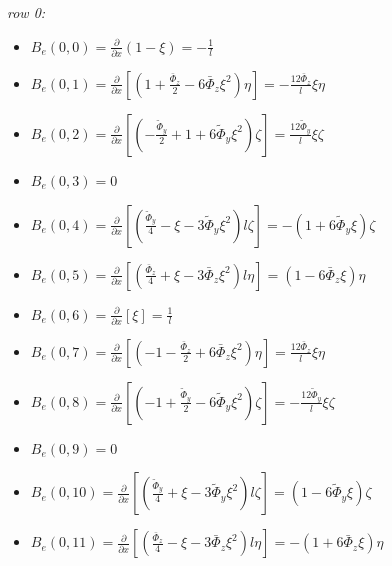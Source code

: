 \documentclass[a4paper,11pt]{article}
\newcommand{\gr}{\textbf}
\begin{document}
\noindent \textit{row 0:}
\begin{itemize}[label=$\gr{-}$, font=\LARGE, font=\color{color1}, topsep = 0.2cm, itemsep=0.2cm]
	\item $B_e(0,0) = \frac{\partial}{\partial x} (1- \xi) = -\frac{1}{l}$
	\item $B_e(0,1) = \frac{\partial}{\partial x} \left[ \left( 1 + \frac{\bar{\Phi}_z}{2} - 6 \bar{\Phi}_z \xi^2 \right) \eta \right] = - \frac{12 \bar{\Phi}_z}{l} \xi \eta$
	\item $B_e(0,2) = \frac{\partial}{\partial x} \left[ \left( -\frac{\tilde{\Phi}_y}{2} + 1 + 6 \tilde{\Phi}_y \xi^2 \right) \zeta \right] = \frac{12 \tilde{\Phi}_y}{l} \xi \zeta $
	\item $B_e(0,3) = 0$
	\item $B_e(0,4) = \frac{\partial}{\partial x} \left[ \left( \frac{\tilde{\Phi}_y}{4} - \xi - 3 \tilde{\Phi}_y \xi^2 \right) l \zeta \right] = - (1 + 6\tilde{\Phi}_y \xi) \zeta $
	\item $B_e(0,5) = \frac{\partial}{\partial x} \left[ \left( \frac{\bar{\Phi}_z}{4} + \xi - 3 \bar{\Phi}_z \xi^2 \right) l \eta \right] = (1 - 6 \bar{\Phi}_z \xi) \eta $
	\item $B_e(0,6) = \frac{\partial}{\partial x} \left[ \xi \right] = \frac{1}{l}$
	\item $B_e(0,7) = \frac{\partial}{\partial x} \left[ \left( - 1 - \frac{\bar{\Phi}_z}{2} + 6 \bar{\Phi}_z \xi^2 \right) \eta \right] = \frac{12 \bar{\Phi}_z }{l} \xi \eta$
	\item $B_e(0,8) = \frac{\partial}{\partial x} \left[ \left( -1 + \frac{\tilde{\Phi}_y}{2} - 6 \tilde{\Phi}_y \xi^2 \right) \zeta \right] = - \frac{12 \tilde{\Phi}_y }{l} \xi \zeta$
	\item $B_e(0,9) = 0$
	\item $B_e(0,10) = \frac{\partial}{\partial x} \left[ \left( \frac{\tilde{\Phi}_y}{4} +\xi - 3 \tilde{\Phi}_y \xi^2 \right) l \zeta \right] = (1 - 6 \tilde{\Phi}_y \xi) \zeta$
	\item $B_e(0,11) = \frac{\partial}{\partial x} \left[ \left( \frac{\bar{\Phi}_z}{4} - \xi - 3 \bar{\Phi}_z \xi^2 \right) l \eta \right] = - (1 + 6 \bar{\Phi}_z \xi) \eta $
\end{itemize}
\end{document}
